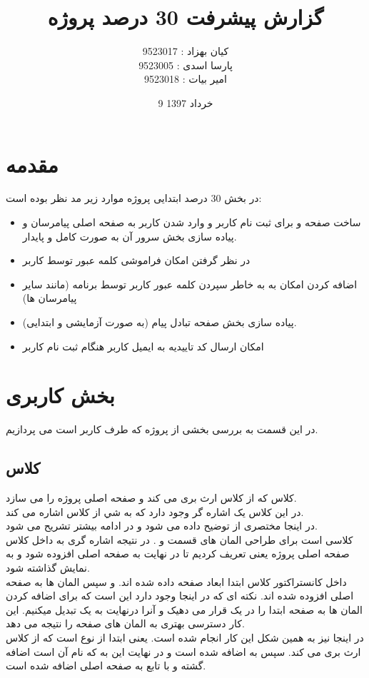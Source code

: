 \documentclass[12pt,onecolumn,a4paper]{article}
\begin{document}
\title{گزارش پیشرفت 30 درصد پروژه} 
\author{کیان بهزاد : 9523017\\
پارسا اسدی : 9523005\\
امیر بیات : 9523018}
\date{9 خرداد 1397}
\maketitle

\section{مقدمه} 
در بخش 30 درصد ابتدایی پروژه موارد زیر مد نظر بوده است:
\begin{itemize}
	\item ساخت صفحه
و
برای ثبت نام کاربر و وارد شدن کاربر به صفحه اصلی پیامرسان و پیاده سازی بخش سرور آن به صورت کامل و پایدار.
	\item در نظر گرفتن امکان فراموشی کلمه عبور توسط کاربر
	\item اضافه کردن امکان به به خاطر سپردن کلمه عبور کاربر توسط برنامه (مانند سایر پیامرسان ها)
	\item پیاده سازی بخش
صفحه تبادل پیام (به صورت آزمایشی و ابتدایی).
\item امکان ارسال کد تاییدیه به ایمیل کاربر هنگام ثبت نام کاربر 
\end{itemize}
\section{بخش کاربری} 
در این قسمت به بررسی بخشی از پروژه که طرف کاربر است می پردازیم.
\subsection{کلاس }
کلاس
 که از کلاس
 ارث بری می کند و صفحه اصلی پروژه را می سازد.\\
در این کلاس یک اشاره گر وجود دارد که به شي از کلاس
 اشاره می کند. \\
در اینجا مختصری از
 توضیح داده می شود و در ادامه بیشتر تشریح می شود.\\
 کلاسی است برای طراحی المان های قسمت
و
.
در نتیجه اشاره گری به
 داخل کلاس صفحه اصلی پروژه یعنی
 تعریف کردیم تا در نهایت به صفحه اصلی افزوده شود و به نمایش گذاشته شود.\\
داخل کانستراکتور  کلاس
 ابتدا ابعاد صفحه داده شده اند. و سپس المان ها به صفحه اصلی افزوده شده اند. 
نکته ای که در اینجا وجود دارد این است که برای اضافه کردن المان ها به صفحه ابتدا
 را در یک
 قرار می دهیک و آنرا درنهایت به یک
 تبدیل میکنیم. این کار دسترسی بهتری به المان های صفحه را نتیجه می دهد.\\
در اینجا نیز به همین شکل این کار انجام شده است. یعنی ابتدا
 از نوع
 است که
 از کلاس
 ارث بری می کند. سپس به
 اضافه شده است و در نهایت این
 به
 که نام آن
 است اضافه گشته و با تابع
 به صفحه اصلی اضافه شده است.
\end{document}
